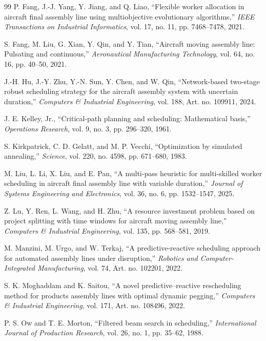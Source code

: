 \documentclass[journal,10pt]{IEEEtran}
\begin{document}
\begin{thebibliography}{99}
 P. Fang, J.-J. Yang, Y. Jiang, and Q. Liao, ``Flexible worker allocation in aircraft final assembly line using multiobjective evolutionary algorithms,'' \emph{IEEE Transactions on Industrial Informatics}, vol. 17, no. 11, pp. 7468--7478, 2021.

 S. Fang, M. Liu, G. Xian, Y. Qin, and Y. Tian, ``Aircraft moving assembly line: Pulsating and continuous,'' \emph{Aeronautical Manufacturing Technology}, vol. 64, no. 16, pp. 40--50, 2021.

 J.-H. Hu, J.-Y. Zhu, Y.-N. Sun, Y. Chen, and W. Qin, ``Network-based two-stage robust scheduling strategy for the aircraft assembly system with uncertain duration,'' \emph{Computers \& Industrial Engineering}, vol. 188, Art. no. 109911, 2024.

 J. E. Kelley, Jr., ``Critical-path planning and scheduling: Mathematical basis,'' \emph{Operations Research}, vol. 9, no. 3, pp. 296--320, 1961.

 S. Kirkpatrick, C. D. Gelatt, and M. P. Vecchi, ``Optimization by simulated annealing,'' \emph{Science}, vol. 220, no. 4598, pp. 671--680, 1983.

 M. Liu, L. Li, X. Liu, and E. Pan, ``A multi-pass heuristic for multi-skilled worker scheduling in aircraft final assembly line with variable duration,'' \emph{Journal of Systems Engineering and Electronics}, vol. 36, no. 6, pp. 1532--1547, 2025.

 Z. Lu, Y. Ren, L. Wang, and H. Zhu, ``A resource investment problem based on project splitting with time windows for aircraft moving assembly line,'' \emph{Computers \& Industrial Engineering}, vol. 135, pp. 568--581, 2019.

 M. Manzini, M. Urgo, and W. Terkaj, ``A predictive-reactive scheduling approach for automated assembly lines under disruption,'' \emph{Robotics and Computer-Integrated Manufacturing}, vol. 74, Art. no. 102201, 2022.

 S. K. Moghaddam and K. Saitou, ``A novel predictive--reactive rescheduling method for products assembly lines with optimal dynamic pegging,'' \emph{Computers \& Industrial Engineering}, vol. 171, Art. no. 108496, 2022.

 P. S. Ow and T. E. Morton, ``Filtered beam search in scheduling,'' \emph{International Journal of Production Research}, vol. 26, no. 1, pp. 35--62, 1988.


\end{thebibliography}
\end{document}
